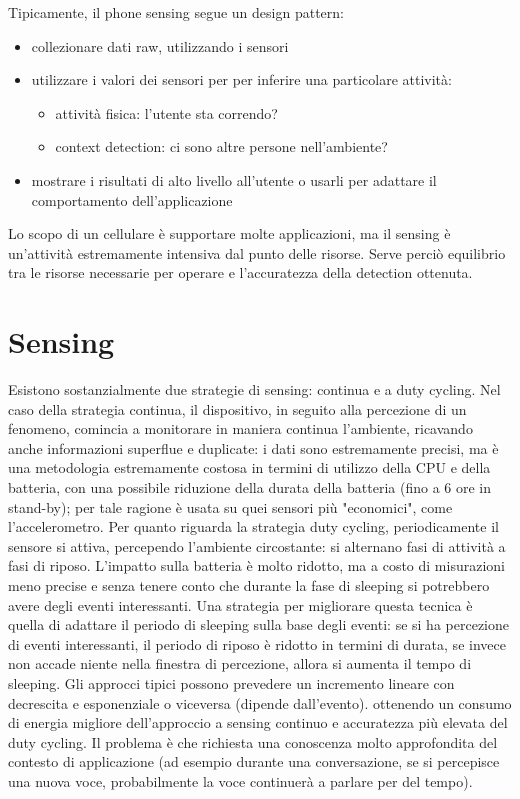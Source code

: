 Tipicamente, il phone sensing segue un design pattern:
\begin{itemize}
\item collezionare dati raw, utilizzando i sensori
\item utilizzare i valori dei sensori per per inferire una particolare
attività:
\begin{itemize}
\item attività fisica: l'utente sta correndo?
\item context detection: ci sono altre persone nell'ambiente?
\end{itemize}
\item mostrare i risultati di alto livello all'utente o usarli per adattare il
comportamento dell'applicazione
\end{itemize}

Lo scopo di un cellulare è supportare molte applicazioni, ma il sensing è
un'attività estremamente intensiva dal punto delle risorse. Serve perciò
equilibrio tra le risorse necessarie per operare e l'accuratezza della detection
ottenuta.

\section{Sensing}
Esistono sostanzialmente due strategie di sensing: continua e a duty cycling.
Nel caso della strategia continua, il dispositivo, in seguito alla percezione di
un fenomeno, comincia a monitorare in maniera continua l'ambiente, ricavando
anche informazioni superflue e duplicate: i dati sono estremamente precisi, ma è
una metodologia estremamente costosa in termini di utilizzo della CPU e della
batteria, con una possibile riduzione della durata della batteria (fino a 6 ore
in stand-by); per tale ragione è usata su quei sensori più "economici", come
l'accelerometro.
Per quanto riguarda la strategia duty cycling, periodicamente il sensore si
attiva, percependo l'ambiente circostante: si alternano fasi di attività a fasi
di riposo. L'impatto sulla batteria è molto ridotto, ma a costo di misurazioni
meno precise e senza tenere conto che durante la fase di sleeping si potrebbero
avere degli eventi interessanti.
Una strategia per migliorare questa tecnica è quella di adattare il periodo di
sleeping sulla base degli eventi: se si ha percezione di eventi interessanti, il
periodo di riposo è ridotto in termini di durata, se invece non accade niente
nella finestra di percezione, allora si aumenta il tempo di sleeping.
Gli approcci tipici possono prevedere un incremento lineare con decrescita e
esponenziale o viceversa (dipende dall'evento). ottenendo un consumo di energia
migliore dell'approccio a sensing continuo e accuratezza più elevata del duty
cycling.
Il problema è che richiesta una conoscenza molto approfondita del contesto di
applicazione (ad esempio durante una conversazione, se si percepisce una nuova
voce, probabilmente la voce continuerà a parlare per del tempo).

